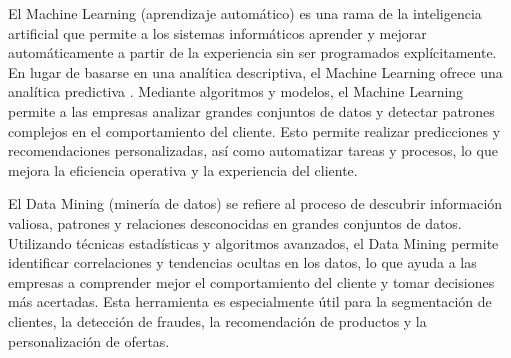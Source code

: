 El Machine Learning (aprendizaje automático) es una rama de la inteligencia artificial que permite a los sistemas informáticos aprender y mejorar automáticamente a partir de la experiencia sin ser programados explícitamente. En lugar de basarse en una analítica descriptiva, el Machine Learning ofrece una analítica predictiva \cite{analitica-empresarial}. Mediante algoritmos y modelos, el Machine Learning permite a las empresas analizar grandes conjuntos de datos y detectar patrones complejos en el comportamiento del cliente. Esto permite realizar predicciones y recomendaciones personalizadas, así como automatizar tareas y procesos, lo que mejora la eficiencia operativa y la experiencia del cliente.

El Data Mining (minería de datos) se refiere al proceso de descubrir información valiosa, patrones y relaciones desconocidas en grandes conjuntos de datos. Utilizando técnicas estadísticas y algoritmos avanzados, el Data Mining permite identificar correlaciones y tendencias ocultas en los datos, lo que ayuda a las empresas a comprender mejor el comportamiento del cliente y tomar decisiones más acertadas. Esta herramienta es especialmente útil para la segmentación de clientes, la detección de fraudes, la recomendación de productos y la personalización de ofertas.
